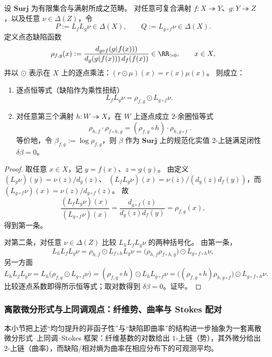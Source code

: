 \begin{theorem}\label{thm:pom-bc-defect-multiplicative-2cocycle}
设 \(\mathbf{Surj}\) 为有限集合与满射所成之范畴。
对任意可复合满射 \(f:X\twoheadrightarrow Y\)、\(g:Y\twoheadrightarrow Z\)，以及任意 \(\nu\in\Delta(Z)\)，令
\[
P:=L_fL_g\nu\in\Delta(X),\qquad Q:=L_{g\circ f}\nu\in\Delta(X).
\]
定义点态缺陷函数
\[
\rho_{f,g}(x):=\frac{d_{g\circ f}(g(f(x)))}{d_g(g(f(x)))\,d_f(f(x))}\in\RR_{>0},\qquad x\in X,
\]
并以 \(\odot\) 表示在 \(X\) 上的逐点乘法：\((r\odot\mu)(x)=r(x)\mu(x)\)。
则成立：
\begin{enumerate}
  \item 逐点恒等式（缺陷作为乘性扭结）
  \[
  \boxed{\;L_fL_g\nu=\rho_{f,g}\odot L_{g\circ f}\nu.\;}
  \]
  \item 对任意第三个满射 \(h:W\twoheadrightarrow X\)，在 \(W\) 上逐点成立 \(2\)-余圈恒等式
  \[
  \boxed{\;
  \rho_{h,f}\cdot \rho_{f\circ h,g}
  =(\rho_{f,g}\circ h)\cdot \rho_{h,g\circ f}\; }.
  \]
  等价地，令 \(\beta_{f,g}:=\log\rho_{f,g}\)，则 \(\beta\) 作为 \(\mathbf{Surj}\) 上的规范化实值 \(2\)-上链满足闭性 \(\delta\beta=0\)。
\end{enumerate}
\end{theorem}
\begin{proof}
取任意 \(x\in X\)，记 \(y=f(x)\)、\(z=g(y)\)。
由定义
\(
(L_g\nu)(y)=\nu(z)/d_g(z)
\)、
\(
(L_fL_g\nu)(x)=\nu(z)/(d_g(z)d_f(y))
\)，而
\(
(L_{g\circ f}\nu)(x)=\nu(z)/d_{g\circ f}(z)
\)。
故
\[
\frac{(L_fL_g\nu)(x)}{(L_{g\circ f}\nu)(x)}
=\frac{d_{g\circ f}(z)}{d_g(z)d_f(y)}
=\rho_{f,g}(x),
\]
得到第一条。
\par
对第二条，对任意 \(\nu\in\Delta(Z)\) 比较 \(L_hL_fL_g\nu\) 的两种括号化。
由第一条，
\[
L_hL_fL_g\nu
=\rho_{h,f}\odot L_{f\circ h}L_g\nu
=\bigl(\rho_{h,f}\rho_{f\circ h,g}\bigr)\odot L_{g\circ f\circ h}\nu,
\]
另一方面
\[
L_hL_fL_g\nu
=L_h\bigl(\rho_{f,g}\odot L_{g\circ f}\nu\bigr)
=(\rho_{f,g}\circ h)\odot L_hL_{g\circ f}\nu
=\bigl((\rho_{f,g}\circ h)\rho_{h,g\circ f}\bigr)\odot L_{g\circ f\circ h}\nu.
\]
比较逐点系数即得所示恒等式；取对数得到 \(\delta\beta=0\)。证毕。
\end{proof}

\subsubsection{离散微分形式与上同调观点：纤维势、曲率与 Stokes 配对}\label{subsubsec:pom-bc-discrete-forms-stokes}
本小节把上述“均匀提升的非函子性”与“缺陷即曲率”的结构进一步抽象为一套离散微分形式--上同调--Stokes 框架：纤维基数的对数给出 \(1\)-上链（势），其外微分给出 \(2\)-上链（曲率），而缺陷/相对熵为曲率在相应分布下的可观测平均。

